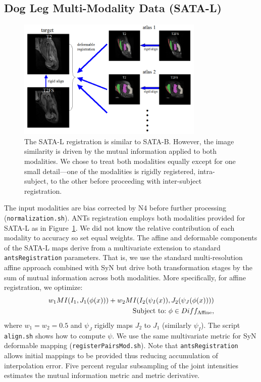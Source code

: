 \documentclass{llncs}
\begin{document}
\subsection{Dog Leg Multi-Modality Data (SATA-L)}
\begin{figure}[t]
 \centering 
  \includegraphics[width=3.5in]{../figs/canine-leg-registration.png}
 \caption{The SATA-L registration is similar to SATA-B.  However, the
image similarity is driven by the mutual information applied to both
modalities.  We chose to treat both modalities equally except for one
small detail---one of the modalities is rigidly registered,
intra-subject, to the other before proceeding with inter-subject
registration.}
 \label{fig:Lmethods}
\end{figure}
The input modalities are
bias corrected by N4 \cite{Tustison2010} before further processing (\texttt{normalization.sh}).  ANTs
registration employs both modalities provided for SATA-L as in Figure~\ref{fig:Lmethods}.  We did not
know the relative contribution of each modality to accuracy so set
equal weights.  The affine and deformable components of the SATA-L
maps derive from a multivariate extension to standard
\texttt{antsRegistration} parameters.  That is, we use the standard
multi-resolution affine approach combined with SyN but drive both
transformation stages by the sum of mutual information across both
modalities.  More specifically, for affine registration, we optimize:
\begin{eqnarray}
w_1 MI(  I_1 , J_1( \phi(x) ) ) +
w_2 MI(  I_2(\psi_I(x)) , J_2( \psi_J(\phi(x)) ) ) \notag \\ 
\text{Subject to:}~\phi \in Diff_\text{Affine},
\end{eqnarray}
where $w_1=w_2=0.5$ and $\psi_J$ rigidly maps $J_2$ to $J_1$
(similarly $\psi_I$).  The script \texttt{align.sh} shows how to
compute $\psi$.  We use the same multivariate metric for SyN deformable mapping (\texttt{registerPairsMod.sh}).  Note that
\texttt{antsRegistration} allows initial mappings to be provided thus
reducing accumulation of interpolation error.  Five percent regular
subsampling of the joint intensities estimates the mutual information
metric and metric derivative.
\end{document}
